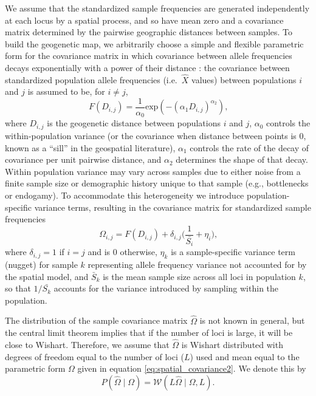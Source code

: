 \documentclass[12pt]{article}
\newcommand{\given}{\mid}
\begin{document}
We assume that the standardized sample frequencies are generated independently at each locus by a spatial process,
and so have mean zero and a covariance matrix determined by the pairwise geographic distances between samples. 
To build the geogenetic map, we arbitrarily choose a simple and flexible parametric form for the covariance matrix 
in which covariance between allele frequencies decays exponentially with a power of their distance
\citep{Diggle1998, Wasser2004, Bradburd2013}:
the covariance between standardized population allele frequencies (i.e.~$\hat X$ values) between populations $i$ and $j$ is assumed to be, for $i \neq j$,
\begin{equation}
\label{eq:spatial_covariance}
F(D_{i,j}) = \frac{1}{\alpha_0} \text{exp} \left(	-\left(\alpha_1 D_{i,j} \right)^{\alpha_2} \right) \text{,}
\end{equation}
where $D_{i,j}$ is the geogenetic distance between populations $i$ and $j$, 
$\alpha_0$ controls the within-population variance 
(or the covariance when distance between points is 0, known as a ``sill'' in the geospatial literature),
$\alpha_1$ controls the rate of the decay of covariance per unit pairwise distance, and $\alpha_2$ determines the shape of that decay.  
Within population variance may vary across samples due to either noise from a finite sample size or demographic history unique to that sample (e.g., bottlenecks or endogamy).  
To accommodate this heterogeneity we introduce population-specific variance terms,
resulting in the covariance matrix for standardized sample frequencies
\begin{equation}
\label{eq:spatial_covariance2}
\Omega_{i,j} =F(D_{i,j}) + \delta_{i,j} \big(\frac{1}{\bar{S_{i}}} + \eta_{i} \big) \text{,}
\end{equation} 
where $\delta_{i,j}=1$ if $i=j$ and is $0$ otherwise,
$\eta_k$ is a sample-specific variance term (nugget) for sample $k$ representing allele frequency variance not accounted for by the spatial model,
and $\bar{S}_k$ is the mean sample size across all loci in population $k$,
so that $1/\bar{S_k}$ accounts for the variance introduced by sampling within the population.

The distribution of the sample covariance matrix $\hat \Omega$ is not known in general,
but the central limit theorem implies that if the number of loci is large, it will be close to Wishart.
Therefore, we assume that $\hat \Omega$ 
is Wishart distributed with degrees of freedom equal to the number of loci ($L$) used
and mean equal to the parametric form $\Omega$ given in equation \eqref{eq:spatial_covariance2}.
We denote this by
\begin{equation}
\label{eq:wishart_dist}
P(\widehat{\Omega} \given \Omega) = \mathcal{W}\left( L\widehat{\Omega} \mid \Omega, L \right) .
\end{equation}
\end{document}
